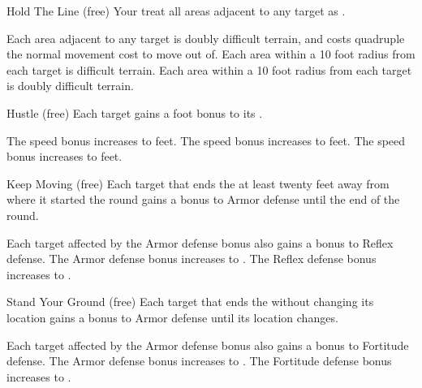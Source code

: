 {            \begin{durationability}{Hold The Line}
                 (free)
                \rankline
                Your  treat all areas adjacent to any target as .

                \rankline
                 Each area adjacent to any target is doubly difficult terrain, and costs quadruple the normal movement cost to move out of.
                 Each area within a 10 foot radius  from each target is difficult terrain.
                 Each area within a 10 foot radius  from each target is doubly difficult terrain.
            \end{durationability}

            \begin{durationability}{Hustle}
                 (free)
                \rankline
                Each target gains a  foot bonus to its .

                \rankline
                 The speed bonus increases to  feet.
                 The speed bonus increases to  feet.
                 The speed bonus increases to  feet.
            \end{durationability}

            \begin{durationability}{Keep Moving}
                 (free)
                \rankline
                Each target that ends the  at least twenty feet away from where it started the round
                    gains a  bonus to Armor defense until the end of the round.

                \rankline
                 Each target affected by the Armor defense bonus also gains a  bonus to Reflex defense.
                 The Armor defense bonus increases to .
                 The Reflex defense bonus increases to .
            \end{durationability}

            \begin{durationability}{Stand Your Ground}
                 (free)
                \rankline
                Each target that ends the  without changing its location gains a  bonus to Armor defense until its location changes.

                \rankline
                 Each target affected by the Armor defense bonus also gains a  bonus to Fortitude defense.
                 The Armor defense bonus increases to .
                 The Fortitude defense bonus increases to .
            \end{durationability}
        }

